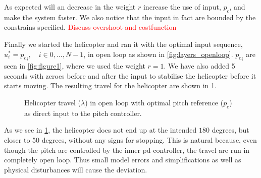 \documentclass[11pt, a4paper, USenglish]{article} %
\begin{document}
As expected will an decrease in the weight $r$ increase the use of input, $p_c$, and make the system faster. We also notice that the input in fact are bounded by the constrains specified.
\textcolor{red}{Discuss overshoot and costfunction}

Finally we started the helicopter and ran it with the optimal input sequence, $u^*_i ={p_c}_i, \quad i \in{0,\dots,N-1}$, in open loop as shown in \cref{fig:layers_openloop}. ${p_c}_i$ are seen in \cref{fig:figure1}, where we used the weight $r=1$. We have also added 5 seconds with zeroes before and after the input to stabilise the helicopter before it starts moving. The resulting travel for the helicopter are shown in \cref{fig:figure4}.

\begin{figure}[H]
        \centering
        \setlength{\figureheight}{6cm}
        \setlength{\figurewidth}{10cm}
        
        \caption{Helicopter travel ($\lambda$) in open loop with optimal pitch reference ($p_c$) as direct input to the pitch controller.}
\label{fig:figure4}
\end{figure}
As we see in \cref{fig:figure4}, the helicopter does not end up at the intended $180$ degrees, but closer to 50 degrees, without any signs for stopping. This is natural because, even though the pitch are controlled by the inner pd-controller, the travel are run in completely open loop. Thus small model errors and simplifications as well as physical disturbances will cause the deviation. 
\end{document}
